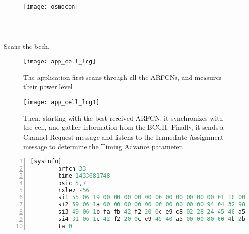       \begin{figure}[h]
        \centering
        \texttt{[image: osmocon]}
        \caption{~\cite{osmocombb_osmocon}}
        \label{fig:osmocon}
      \end{figure}

    \subsection{}

    \iffalse
       The cell_log application scans through valid available carrier
       frequencies, attempts to sync to them and dumps information
       gathered from the BCCH.

       It is usually used to create a list of used ARFCNs and
       information such as their reception levels, MNC, MCC, and System
       Information. 
       \fi

       Scans the bcch.

      \begin{figure}[h]
        \centering
        \texttt{[image: app\_cell\_log]}
        \caption{The  application first scans through
        all the ARFCNs, and measures their power level.}
        \label{fig:app_cell_log}
      \end{figure}

      \begin{figure}[h]
        \centering
        \texttt{[image: app\_cell\_log1]}
        \caption{Then, starting with the best received ARFCN, it
          synchronizes with the cell, and gather information from the
          BCCH. Finally, it sends a Channel Request message and listens
          to the Immediate Assignment message to determine the Timing
          Advance parameter.}
        \label{fig:app_cell_log1}
      \end{figure}

      \begin{lstlisting}[language=C, numbers=left,
      basicstyle=\footnotesize, breaklines=true, frame=single]
        [sysinfo]
        arfcn 33
        time 1433681748
        bsic 5,7
        rxlev -56
        si1 55 06 19 00 00 00 00 00 00 00 00 00 00 00 01 10 00 00 00 a5 00 00 2b
        si2 59 06 1a 00 00 00 00 00 00 00 00 00 00 94 04 32 98 18 d0 df a5 00 00
        si3 49 06 1b fa fb 42 f2 20 0c e9 c8 02 28 24 45 40 a5 00 00 80 00 01 1b
        si4 31 06 1c 42 f2 20 0c e9 45 40 a5 00 00 80 00 4b 2b 2b 2b 2b 2b 2b 2b
        ta 0
        \end{lstlisting}
    
